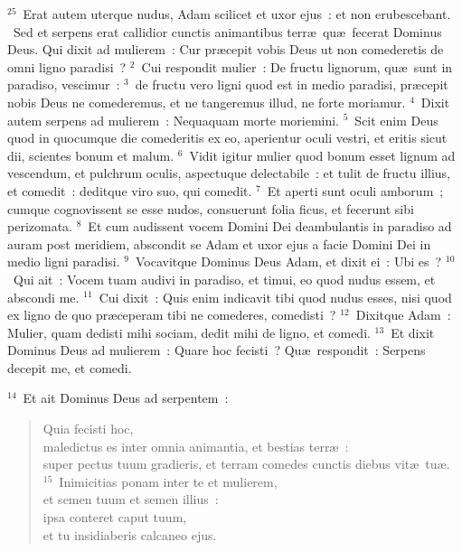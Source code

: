 ${}^{25}$~Erat autem uterque nudus, Adam scilicet et uxor ejus~: et non erubescebant.
~Sed et serpens erat callidior cunctis animantibus terr\ae\ qu\ae\ fecerat Dominus Deus. Qui dixit ad mulierem~: Cur pr\ae cepit vobis Deus ut non comederetis de omni ligno paradisi~?
${}^{2}$~Cui respondit mulier~: De fructu lignorum, qu\ae\ sunt in paradiso, vescimur~:
${}^{3}$~de fructu vero ligni quod est in medio paradisi, pr\ae cepit nobis Deus ne comederemus, et ne tangeremus illud, ne forte moriamur.
${}^{4}$~Dixit autem serpens ad mulierem~: Nequaquam morte moriemini.
${}^{5}$~Scit enim Deus quod in quocumque die comederitis ex eo, aperientur oculi vestri, et eritis sicut dii, scientes bonum et malum.
${}^{6}$~Vidit igitur mulier quod bonum esset lignum ad vescendum, et pulchrum oculis, aspectuque delectabile~: et tulit de fructu illius, et comedit~: deditque viro suo, qui comedit.
${}^{7}$~Et aperti sunt oculi amborum~; cumque cognovissent se esse nudos, consuerunt folia ficus, et fecerunt sibi perizomata.
${}^{8}$~Et cum audissent vocem Domini Dei deambulantis in paradiso ad auram post meridiem, abscondit se Adam et uxor ejus a facie Domini Dei in medio ligni paradisi.
${}^{9}$~Vocavitque Dominus Deus Adam, et dixit ei~: Ubi es~?
${}^{10}$~Qui ait~: Vocem tuam audivi in paradiso, et timui, eo quod nudus essem, et abscondi me.
${}^{11}$~Cui dixit~: Quis enim indicavit tibi quod nudus esses, nisi quod ex ligno de quo pr\ae ceperam tibi ne comederes, comedisti~?
${}^{12}$~Dixitque Adam~: Mulier, quam dedisti mihi sociam, dedit mihi de ligno, et comedi.
${}^{13}$~Et dixit Dominus Deus ad mulierem~: Quare hoc fecisti~? Qu\ae\ respondit~: Serpens decepit me, et comedi.


${}^{14}$~Et ait Dominus Deus ad serpentem~: \begin{flushleft}\begin{verse}Quia fecisti hoc,\\ maledictus es inter omnia animantia, et bestias terr\ae~:\\ super pectus tuum gradieris, et terram comedes cunctis diebus vit\ae\ tu\ae .\\
${}^{15}$~Inimicitias ponam inter te et mulierem,\\ et semen tuum et semen illius~:\\ ipsa conteret caput tuum,\\ et tu insidiaberis calcaneo ejus.\end{verse}\end{flushleft}


